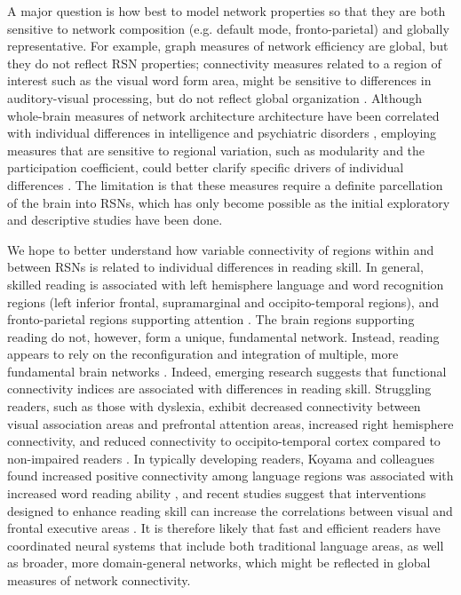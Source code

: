 A major question is how best to model network properties so that they are both sensitive to network composition (e.g. default mode, fronto-parietal) and globally representative. For example, graph measures of network efficiency are global, but they do not reflect RSN properties; connectivity measures related to a region of interest such as the visual word form area, might be sensitive to differences in auditory-visual processing, but do not reflect global organization \citep{Rubinov2010}. Although whole-brain measures of network architecture architecture have been correlated with individual differences in intelligence and psychiatric disorders \citep{Stam2014}, employing measures that are sensitive to regional variation, such as modularity and the participation coefficient, could better clarify specific drivers of individual differences \citep{Cao2016}. The limitation is that these measures require a definite parcellation of the brain into RSNs, which has only become possible as the initial exploratory and descriptive studies have been done.

We hope to better understand how variable connectivity of regions within and between RSNs is related to individual differences in reading skill. In general, skilled reading is associated with left hemisphere language and word recognition regions (left inferior frontal, supramarginal and occipito-temporal regions), and fronto-parietal regions supporting attention \citep{Paulesu2014}. The brain regions supporting reading do not, however, form a unique, fundamental network. Instead, reading appears to rely on the reconfiguration and integration of multiple, more fundamental brain networks \citep{Koyama2010, Vogel2013}. Indeed, emerging research suggests that functional connectivity indices are associated with differences in reading skill. Struggling readers, such as those with dyslexia, exhibit decreased connectivity between visual association areas and prefrontal attention areas, increased right hemisphere connectivity, and reduced connectivity to occipito-temporal cortex compared to non-impaired readers \citep{Finn2014}. In typically developing readers, Koyama and colleagues found increased positive connectivity among language regions was associated with increased word reading ability \citep{Koyama2011}, and recent studies suggest that interventions designed to enhance reading skill can increase the correlations between visual and frontal executive areas \citep{Horowitz-Kraus2015}. It is therefore likely that fast and efficient readers have coordinated neural systems that include both traditional language areas, as well as broader, more domain-general networks, which might be reflected in global measures of network connectivity.

